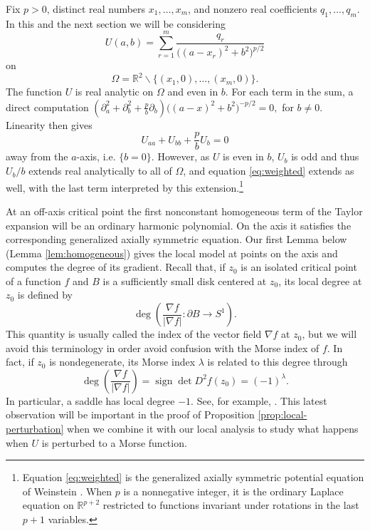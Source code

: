 \documentclass[leqno,11pt]{amsart}
\numberwithin{equation}{section}
\newcommand{\bbR}{\mathbb{R}}
\DeclareMathOperator\degmap{deg}
\theoremstyle{definition}
\begin{document}
	Fix $p>0$, distinct real numbers $x_1,\ldots,x_m$, and nonzero real coefficients $q_1,\ldots,q_m$. In this and the next section we will be considering
	\begin{equation}\label{eq:U}
		U(a,b)=\sum_{r=1}^m \frac{q_r}{\big((a-x_r)^2+b^2\big)^{p/2}}
	\end{equation}
	on
	\[
	\Omega=\bbR^2\backslash\{(x_1,0),\ldots,(x_m,0)\}.
	\]
	The function $U$ is real analytic on $\Omega$ and even in $b$. For each term in the sum, a direct computation 
	\(
	\left(\partial_a^2+\partial_b^2+\frac{p}{b}\partial_b\right)
	\big((a-x)^2+b^2\big)^{-p/2}=0,
	\)
	for $b \neq 0$. Linearity then gives 
	\begin{equation}\label{eq:weighted}
		U_{aa}+U_{bb}+\frac{p}{b}U_b=0
	\end{equation}
	away from the $a$-axis, i.e. $\{b =0\}$. However, as $U$ is even in $b$, $U_b$ is odd and thus $U_b/b$ extends real analytically to all of $\Omega$, and equation \eqref{eq:weighted} extends as well, with the last term interpreted by this extension.\footnote{
		Equation \eqref{eq:weighted} is the generalized axially symmetric potential equation of Weinstein \cite{Weinstein}. When $p$ is a nonnegative integer, it is the ordinary Laplace equation on $\bbR^{p+2}$ restricted to functions invariant under rotations in the last $p+1$ variables.
	}
	
	At an off-axis critical point the first nonconstant homogeneous term of the Taylor expansion will be an ordinary harmonic polynomial. On the axis it satisfies the corresponding generalized axially symmetric equation. Our first Lemma below (Lemma \ref{lem:homogeneous}) gives the local model at points on the axis and computes the degree of its gradient. Recall that, if $z_0$ is an isolated critical point of a function $f$ and $B$ is a sufficiently small disk centered at $z_0$, its local degree at $z_0$ is defined by
	\[
	\degmap\left(\frac{\nabla f}{|\nabla f|}:\partial B\longrightarrow S^1\right).
	\]
	This quantity is usually called the index of the vector field $\nabla f$ at $z_0$, but we will avoid this terminology in order avoid confusion with the Morse index of $f$. In fact, if $z_0$ is nondegenerate, its Morse index $\lambda$ is related to this degree through
	\[
	\degmap\left(\frac{\nabla f}{|\nabla f|} \right)= \operatorname{sign}\det D^2f(z_0)=(-1)^\lambda.
	\]
	In particular, a saddle has local degree $-1$. See, for example, \cite[\S\S5--6]{Milnor}. This latest observation will be important in the proof of Proposition \ref{prop:local-perturbation} when we combine it with our local analysis to study what happens when $U$ is perturbed to a Morse function.
	
\end{document}
